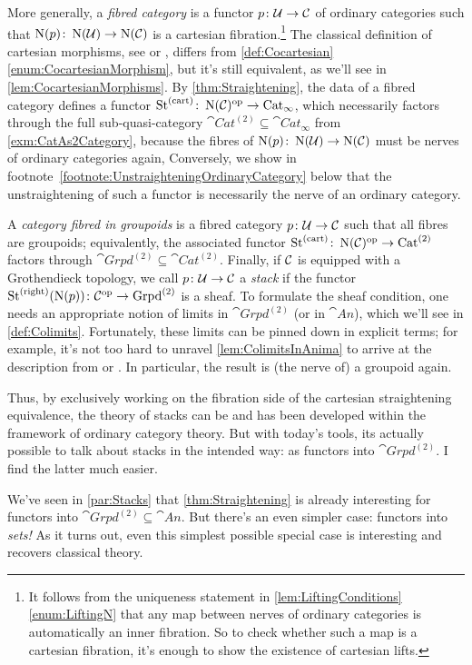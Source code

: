 \begin{numpar}
	More generally, a \emph{fibred category} is a functor $p\colon \mathcal{U}\rightarrow \mathcal{C}$ of ordinary categories such that $\operatorname{N}(p)\colon \operatorname{N}(\mathcal{U})\rightarrow\operatorname{N}(\mathcal{C})$ is a cartesian fibration.\footnote{It follows from the uniqueness statement in \cref{lem:LiftingConditions}\cref{enum:LiftingN} that any map between nerves of ordinary categories is automatically an inner fibration. So to check whether such a map is a cartesian fibration, it's enough to show the existence of cartesian lifts.} The classical definition of cartesian morphisms, see \cite[Definition~3.1.1]{OlssonStacks} or \cite[]{Stacks}, differs from \cref{def:Cocartesian}\cref{enum:CocartesianMorphism}, but it's still equivalent, as we'll see in \cref{lem:CocartesianMorphisms}. By \cref{thm:Straightening}, the data of a fibred category defines a functor $\operatorname{St}^{(\mathrm{cart})}\colon \operatorname{N}(\mathcal{C})^{\mathrm{op}}\rightarrow \mathrm{Cat}_\infty$, which necessarily factors through the full sub-quasi-category $\cat{Cat}^{(2)}\subseteq \cat{Cat}_\infty$ from \cref{exm:CatAs2Category}, because the fibres of $\operatorname{N}(p)\colon \operatorname{N}(\mathcal{U})\rightarrow\operatorname{N}(\mathcal{C})$ must be nerves of ordinary categories again, Conversely, we show in footnote~\cref{footnote:UnstraighteningOrdinaryCategory} below that the unstraightening of such a functor is necessarily the nerve of an ordinary category.
	
	A \emph{category fibred in groupoids} is a fibred category $p\colon \mathcal{U}\rightarrow \mathcal{C}$ such that all fibres are groupoids; equivalently, the associated functor $\operatorname{St}^{(\mathrm{cart})}\colon \operatorname{N}(\mathcal{C})^{\mathrm{op}}\rightarrow \mathrm{Cat}^{(2)}$ factors through $\cat{Grpd}^{(2)}\subseteq \cat{Cat}^{(2)}$. Finally, if $\mathcal{C}$ is equipped with a Grothendieck topology, we call $p\colon \mathcal{U}\rightarrow \mathcal{C}$ a \emph{stack} if the functor $\operatorname{St}^{(\mathrm{right})}(\operatorname{N}(p))\colon \mathcal{C}^{\mathrm{op}}\rightarrow \mathrm{Grpd}^{(2)}$ is a sheaf. To formulate the sheaf condition, one needs an appropriate notion of limits in $\cat{Grpd}^{(2)}$ (or in $\cat{An}$), which we'll see in \cref{def:Colimits}. Fortunately, these limits can be pinned down in explicit terms; for example, it's not too hard to unravel \cref{lem:ColimitsInAnima} to arrive at the description from \cite[\S4.2]{OlssonStacks} or \cite[]{Stacks}. In particular, the result is (the nerve of) a groupoid again.
	
	Thus, by exclusively working on the fibration side of the cartesian straightening equivalence, the theory of stacks can be and has been developed within the framework of ordinary category theory. But with today's tools, its actually possible to talk about stacks in the intended way: as functors into $\cat{Grpd}^{(2)}$. I find the latter much easier.
\end{numpar}
We've seen in \cref{par:Stacks} that \cref{thm:Straightening} is already interesting for functors into $\cat{Grpd}^{(2)}\subseteq \cat{An}$. But there's an even simpler case: functors into \emph{sets!} As it turns out, even this simplest possible special case is interesting and recovers classical theory.


